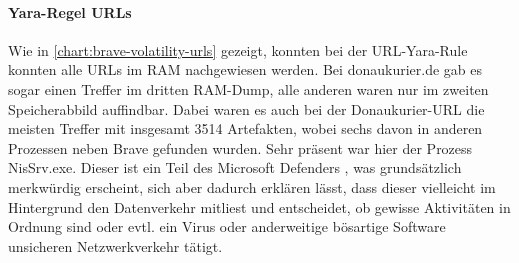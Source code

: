 \paragraph*{Yara-Regel \glqq{}URLs\grqq{}}\label{chap:ergebnisse-brave-uncommon-locations-volatility-urls}

Wie in \ref{chart:brave-volatility-urls} gezeigt, konnten bei der URL-Yara-Rule konnten alle URLs im RAM nachgewiesen werden. Bei \glqq{}donaukurier.de\grqq{} gab es sogar einen Treffer im dritten RAM-Dump, alle anderen waren nur im zweiten Speicherabbild auffindbar. Dabei waren es auch bei der Donaukurier-URL die meisten Treffer mit insgesamt 3514 Artefakten, wobei sechs davon in anderen Prozessen neben Brave gefunden wurden. Sehr präsent war hier der Prozess \glqq{}NisSrv.exe\grqq{}. Dieser ist ein Teil des Microsoft Defenders \cite{pogonin2022microsoft}, was grundsätzlich merkwürdig erscheint, sich aber dadurch erklären lässt, dass dieser vielleicht im Hintergrund den Datenverkehr mitliest und entscheidet, ob gewisse Aktivitäten in Ordnung sind oder evtl. ein Virus oder anderweitige bösartige Software unsicheren Netzwerkverkehr tätigt.

